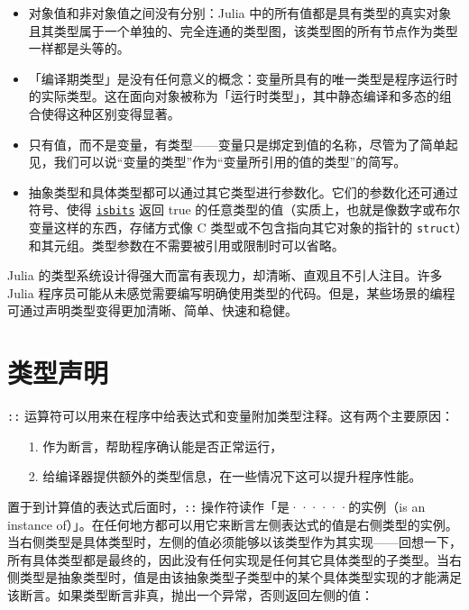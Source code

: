 \begin{itemize}
\item 对象值和非对象值之间没有分别：Julia 中的所有值都是具有类型的真实对象且其类型属于一个单独的、完全连通的类型图，该类型图的所有节点作为类型一样都是头等的。


\item 「编译期类型」是没有任何意义的概念：变量所具有的唯一类型是程序运行时的实际类型。这在面向对象被称为「运行时类型」，其中静态编译和多态的组合使得这种区别变得显著。


\item 只有值，而不是变量，有类型——变量只是绑定到值的名称，尽管为了简单起见，我们可以说“变量的类型”作为“变量所引用的值的类型”的简写。


\item 抽象类型和具体类型都可以通过其它类型进行参数化。它们的参数化还可通过符号、使得 \hyperlink{12980593021531333073}{\texttt{isbits}} 返回 true 的任意类型的值（实质上，也就是像数字或布尔变量这样的东西，存储方式像 C 类型或不包含指向其它对象的指针的 \texttt{struct}）和其元组。类型参数在不需要被引用或限制时可以省略。

\end{itemize}


Julia 的类型系统设计得强大而富有表现力，却清晰、直观且不引人注目。许多 Julia 程序员可能从未感觉需要编写明确使用类型的代码。但是，某些场景的编程可通过声明类型变得更加清晰、简单、快速和稳健。



\hypertarget{11271598028486730305}{}


\section{类型声明}



\texttt{::} 运算符可以用来在程序中给表达式和变量附加类型注释。这有两个主要原因：



\begin{itemize}
\item[1. ] 作为断言，帮助程序确认能是否正常运行，


\item[2. ] 给编译器提供额外的类型信息，在一些情况下这可以提升程序性能。

\end{itemize}


置于到计算值的表达式后面时，\texttt{::} 操作符读作「是······的实例（is an instance of）」。在任何地方都可以用它来断言左侧表达式的值是右侧类型的实例。当右侧类型是具体类型时，左侧的值必须能够以该类型作为其实现——回想一下，所有具体类型都是最终的，因此没有任何实现是任何其它具体类型的子类型。当右侧类型是抽象类型时，值是由该抽象类型子类型中的某个具体类型实现的才能满足该断言。如果类型断言非真，抛出一个异常，否则返回左侧的值：





